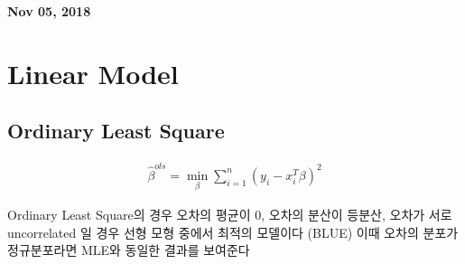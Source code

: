 \documentclass[11pt]{article}
\begin{document}
%

\newcommand{\Ito}{$It\hat{o}$'$s~Lemma$}

\newcommand\ind{\stackrel{\rm ind}{\sim}}
\newcommand\iid{\stackrel{\rm iid}{\sim}}
\renewcommand\c{\mathbf{c}}
\newcommand\y{\mathbf{y}}
\newcommand\z{\mathbf{z}}
\renewcommand\P{\mathbf{P}}
\newcommand\W{\mathbf{W}}
\newcommand\X{\mathbf{X}}
\newcommand\Y{\mathbf{Y}}
\newcommand\Z{\mathbf{Z}}
\newcommand\J{{\cal J}}
\newcommand\B{{\cal B}}
\newcommand\K{{\cal K}}
\newcommand\N{{\rm N}}
\newcommand\bs{\boldsymbol}
\newcommand\bth{\bs\theta}
\newcommand\bbe{\bs\beta}
\renewcommand\*{^\star}

\def\spacingset#1{\renewcommand{\baselinestretch}%
{#1}\small\normalsize} \spacingset{1}



  \bigskip
  \bigskip
  \bigskip
  \begin{center}
    {\LARGE\bf Nov 05, 2018 }
  \end{center}
  \medskip



\spacingset{1.45}











\section{Linear Model} 
\subsection{Ordinary Least Square}


  \begin{align}
    \hat{\beta}^{ols} = \min_{\beta} \sum\limits_{i=1}^n (y_{i} - x_{i}^T \beta)^2 
  \end{align}


Ordinary Least Square의 경우 오차의 평균이 0, 오차의 분산이 등분산, 오차가 서로 uncorrelated 일 경우 선형 모형 중에서 최적의 모델이다 (BLUE) 이때 오차의 분포가 정규분포라면 MLE와 동일한 결과를 보여준다
\end{document}

